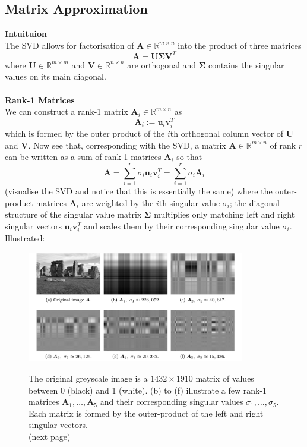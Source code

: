 \documentclass{report}
\begin{document}
\subsection{Matrix Approximation}%
\textbf{Intuituion}\\
The SVD allows for factorisation of $\bm{A}\in\mathbb{R}^{m\times n}$ into the product of three matrices 
\begin{equation*}
\bm{A}=\bm{U\Sigma V}^T
\end{equation*}
where $\bm{U}\in\mathbb{R}^{m\times m}$ and $\bm{V}\in\mathbb{R}^{n\times n}$ are orthogonal and 
$\bm{\Sigma}$ contains the singular values on its main diagonal.\\
\vspace{1mm}\\
\textbf{Rank-1 Matrices}\\
We can construct a rank-1 matrix $\bm{A}_i\in\mathbb{R}^{m\times n}$ as 
\begin{equation*}
\bm{A}_i:=\bm{u}_i\bm{v}_i^T
\end{equation*}
which is formed by the outer product of the $i$th orthogonal column vector of $\bm{U}$ and $\bm{V}$. Now see that,
corresponding with the SVD, a matrix $\bm{A}\in\mathbb{R}^{m\times n}$ of rank $r$ can be written as a sum of
rank-1 matrices $\bm{A}_i$ so that 
\begin{equation*}
\bm{A}=\sum^r_{i=1}\sigma_i\bm{u}_i\bm{v}_i^T=
\sum^r_{i=1}\sigma_i\bm{A}_i
\end{equation*}
(visualise the SVD and notice that this is essentially the same)
where the outer-product matrices $\bm{A}_i$ are weighted by the $i$th singular value $\sigma_i$; the diagonal
structure of the singular value matrix $\bm{\Sigma}$ multiplies only matching left and right singular vectors
$\bm{u}_i\bm{v}_i^T$ and scales them by their corresponding singular value $\sigma_i$. Illustrated:
\begin{figure}[h]
\begin{center}
\includegraphics[width=9.5cm]{24}\\
\end{center}
The original greyscale image is a $1432\times1910$ matrix of values between 0 (black) and 1 (white). 
(b) to (f) illustrate a few rank-1 matrices $\bm{A}_1,\ldots,\bm{A}_5$ and their corresponding singular values
$\sigma_1,\ldots,\sigma_5$. Each matrix is formed by the outer-product of the left and right singular vectors.\\
(next page)
\end{figure}
\end{document}
